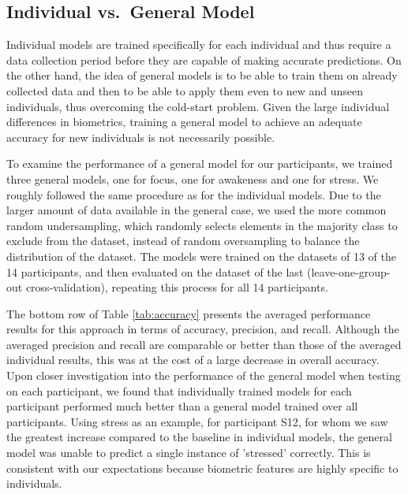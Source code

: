 \subsection{Individual vs.\ General Model}
Individual models are trained specifically for each individual and thus require a data collection period before they are capable of making accurate predictions. On the other hand, the idea of general models is to be able to train them on already collected data and then  to be able to apply them even to new and unseen individuals, thus overcoming the cold-start problem. Given the large individual differences in biometrics, training a general model to achieve an adequate accuracy for new individuals is not necessarily possible. 

To examine the performance of a general model for our participants, we trained three general models, one for focus, one for awakeness and one for stress. We roughly followed the same procedure as for the individual models. Due to the larger amount of data available in the general case, we used the more common random undersampling, which randomly selects elements in the majority class to exclude from the dataset, instead of random oversampling to balance the distribution of the dataset. The models were trained on the datasets of 13 of the 14 participants, and then evaluated on the dataset of the last (leave-one-group-out cross-validation), repeating this process for all 14 participants. 

The bottom row of Table \ref{tab:accuracy} presents the averaged performance results for this approach in terms of accuracy, precision, and recall. Although the averaged precision and recall are comparable or better than those of the averaged individual results, this was at the cost of a large decrease in overall accuracy.  Upon closer investigation into the performance of the general model when testing on each participant, we found that individually trained models for each participant performed much better than a general model trained over all participants. Using stress as an example, for participant S12, for whom we saw the greatest increase compared to the baseline in individual models, the general model was unable to predict a single instance of 'stressed' correctly. This is consistent with our expectations because biometric features are highly specific to individuals.



